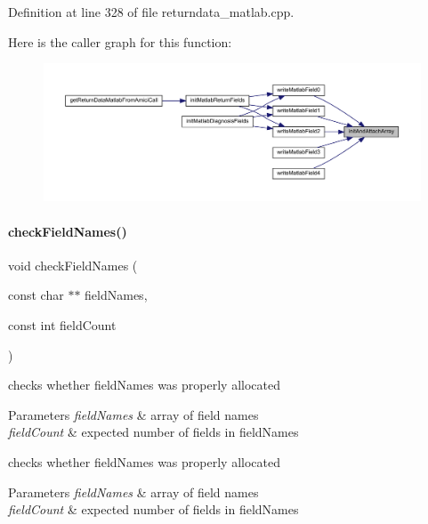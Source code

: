 Definition at line 328 of file returndata\+\_\+matlab.\+cpp.

Here is the caller graph for this function\+:
\nopagebreak
\begin{figure}[H]
\begin{center}
\leavevmode
\includegraphics[width=350pt]{namespaceamici_a10c4b68cefb537f43f52c1f2f23db5f9_icgraph}
\end{center}
\end{figure}
\mbox{\label{namespaceamici_ad34a0a8f0a3d44e86371a2ecb5841c09}} 
\paragraph{\texorpdfstring{checkFieldNames()}{checkFieldNames()}}
{\footnotesize\ttfamily void check\+Field\+Names (\begin{DoxyParamCaption}\item[{const char $\ast$$\ast$}]{field\+Names,  }\item[{const int}]{field\+Count }\end{DoxyParamCaption})}

checks whether field\+Names was properly allocated 
\begin{DoxyParams}{Parameters}
{\em field\+Names} & array of field names \\
\hline
{\em field\+Count} & expected number of fields in field\+Names\\
\hline
\end{DoxyParams}
checks whether field\+Names was properly allocated 
\begin{DoxyParams}{Parameters}
{\em field\+Names} & array of field names \\
\hline
{\em field\+Count} & expected number of fields in field\+Names\\
\hline
\end{DoxyParams}


